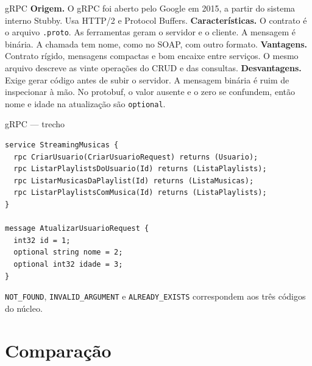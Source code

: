\documentclass[aspectratio=169,11pt]{beamer}
\begin{document}
\begin{frame}{gRPC}
  \textbf{Origem.} O gRPC foi aberto pelo Google em 2015, a partir do sistema interno Stubby. Usa HTTP/2 e Protocol Buffers.
  \vspace{0.35em}
  \textbf{Características.} O contrato é o arquivo \texttt{.proto}. As ferramentas geram o servidor e o cliente. A mensagem é binária. A chamada tem nome, como no SOAP, com outro formato.
  \vspace{0.35em}
  \textbf{Vantagens.} Contrato rígido, mensagens compactas e bom encaixe entre serviços. O mesmo arquivo descreve as vinte operações do CRUD e das consultas.
  \vspace{0.35em}
  \textbf{Desvantagens.} Exige gerar código antes de subir o servidor. A mensagem binária é ruim de inspecionar à mão. No protobuf, o valor ausente e o zero se confundem, então nome e idade na atualização são \texttt{optional}.
\end{frame}

\begin{frame}[fragile]{gRPC --- trecho}
\begin{lstlisting}
service StreamingMusicas {
  rpc CriarUsuario(CriarUsuarioRequest) returns (Usuario);
  rpc ListarPlaylistsDoUsuario(Id) returns (ListaPlaylists);
  rpc ListarMusicasDaPlaylist(Id) returns (ListaMusicas);
  rpc ListarPlaylistsComMusica(Id) returns (ListaPlaylists);
}

message AtualizarUsuarioRequest {
  int32 id = 1;
  optional string nome = 2;
  optional int32 idade = 3;
}
\end{lstlisting}
\texttt{NOT\_FOUND}, \texttt{INVALID\_ARGUMENT} e \texttt{ALREADY\_EXISTS} correspondem aos três códigos do núcleo.
\end{frame}

\section{Comparação}
\end{document}

